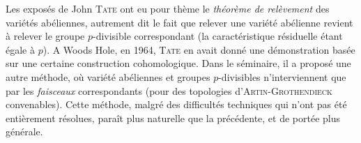 Les exposés de John \textsc{Tate} ont eu pour thème le \textit{théorème de relèvement} des variétés abéliennes, autrement dit le fait que relever une variété abélienne revient à relever le groupe $p$-divisible correspondant (la caractéristique résiduelle étant égale à $p$). A Woods Hole, en 1964, \textsc{Tate} en avait donné une démonstration basée sur une certaine construction cohomologique. Dans le séminaire, il a proposé une autre méthode, où variété abéliennes et groupes $p$-divisibles n’interviennent que par les \textit{faisceaux} correspondants (pour des topologies d’\textsc{Artin-Grothendieck} convenables). Cette méthode, malgré des difficultés techniques qui n’ont pas été entièrement résolues, paraît plus naturelle que la précédente, et de portée plus générale.

